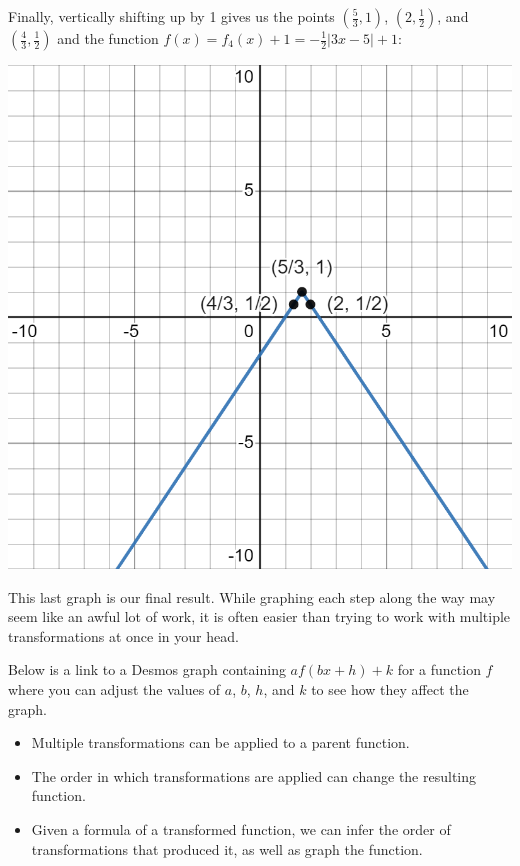 \documentclass[handout, noauthor, nooutcomes]{ximera}
\begin{document}
\begin{example}
\begin{explanation}
Finally, vertically shifting up by 1 gives us the points $\left(\frac{5}{3}, 1\right)$, $\left(2, \frac{1}{2}\right)$, and $\left(\frac{4}{3}, \frac{1}{2}\right)$ and the function $f(x) = f_4(x)+ 1 = -\frac{1}{2}|3x - 5| + 1$:

\includegraphics[width=1\linewidth]{images/exgraph6.png}

This last graph is our final result. While graphing each step along the way may seem like an awful lot of work, it is often easier than trying to work with multiple transformations at once in your head. 
\end{explanation}
\end{example}

Below is a link to a Desmos graph containing $af(bx + h) + k$ for a function $f$ where you can adjust the values of $a$, $b$, $h$, and $k$ to see how they affect the graph. 

\begin{center}  
\end{center}




\begin{summary}\begin{itemize}
\item Multiple transformations can be applied to a parent function.
\item The order in which transformations are applied can change the resulting function.
\item Given a formula of a transformed function, we can infer the order of transformations that produced it, as well as graph the function. 
\end{itemize}\end{summary}
\end{document}
